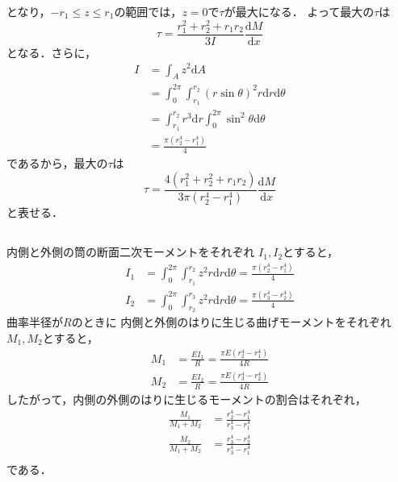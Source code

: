 \documentclass[a4paper]{jsarticle}
\begin{document}
となり，$-r_1 \leq z \leq r_1$の範囲では，$z = 0$で$\tau$が最大になる．
よって最大の$\tau$は
\begin{equation}
  \tau = \frac{r_1^2 + r_2^2 + r_1 r_2}{3 I}\frac{\mathrm{d}M}{\mathrm{d}x}
\end{equation}
となる．さらに，
\begin{equation}
  \begin{aligned}
    I & = \int_A z^2 \mathrm{d}A                       \\
      & = \int_0^{2\pi} \int_{r_1}^{r_2}
    (r \sin \theta)^2 r \mathrm{d} r \mathrm{d} \theta \\
      & = \int_{r_1}^{r_2} r^3 \mathrm{d} r
    \int_0^{2 \pi} \sin^2 \theta \mathrm{d} \theta     \\
      & = \frac{\pi(r_2^4 - r_1^4)}{4}
  \end{aligned}
\end{equation}
であるから，最大の$\tau$は
\begin{equation}
  \tau = \frac{4(r_1^2 + r_2^2 + r_1 r_2)}{3 \pi (r_2^4 - r_1^4)}
  \frac{\mathrm{d} M}{\mathrm{d} x}
\end{equation}
と表せる．

\subsection{}
\subsubsection{}
内側と外側の筒の断面二次モーメントをそれぞれ
$I_1, I_2$とすると，
\begin{align}
  I_1 & = \int_0^{2\pi} \int_{r_1}^{r_2} z^2 r \mathrm{d} r \mathrm{d} \theta
  = \frac{\pi (r_2^4 - r_1^4)}{4}                                             \\
  I_2 & = \int_0^{2\pi} \int_{r_2}^{r_3} z^2 r \mathrm{d} r \mathrm{d} \theta
  = \frac{\pi (r_3^4 - r_2^4)}{4}
\end{align}
曲率半径が$R$のときに
内側と外側のはりに生じる曲げモーメントをそれぞれ
$M_1, M_2$とすると，
\begin{align}
  M_1 & = \frac{E I_1}{R} = \frac{\pi E (r_2^4 - r_1^4)}{4 R} \\
  M_2 & = \frac{E I_2}{R} = \frac{\pi E (r_3^4 - r_2^4)}{4 R}
\end{align}
したがって，内側の外側のはりに生じるモーメントの割合はそれぞれ，
\begin{align}
  \frac{M_1}{M_1 + M_2} & = \frac{r_2^4 - r_1^4}{r_3^4 - r_1^4} \\
  \frac{M_2}{M_1 + M_2} & = \frac{r_3^4 - r_2^4}{r_3^4 - r_1^4} \\
\end{align}
である．
\end{document}
